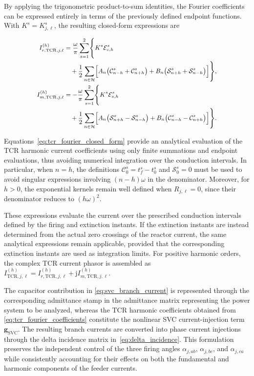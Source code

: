 \documentclass[journal]{IEEEtran}
\begin{document}
By applying the trigonometric product-to-sum identities, the Fourier
coefficients can be expressed entirely in terms of the previously
defined endpoint functions. With $K^s=K_{j,\ell}^s$, the resulting
closed-form expressions are

\begin{subequations}\small
\label{eq:tcr_fourier_closed_form}
\begin{align}
    I_{r,\mathrm{TCR},j,\ell}^{(h)}
    &=\frac{\omega}{\pi}\sum_{s=1}^{2}
    \Biggl\{K^s\mathcal E_{c,h}^s\nonumber\\
    &\quad+\frac{1}{2}\sum_{n\in\mathcal H}
    \Bigl[A_n\bigl(\mathcal C_{n-h}^s+\mathcal C_{n+h}^s\bigr)
    +B_n\bigl(\mathcal S_{n+h}^s+\mathcal S_{n-h}^s\bigr)\Bigr]\Biggr\},\\
    I_{m,\mathrm{TCR},j,\ell}^{(h)}
    &=-\frac{\omega}{\pi}\sum_{s=1}^{2}
    \Biggl\{K^s\mathcal E_{s,h}^s\nonumber\\
    &\quad+\frac{1}{2}\sum_{n\in\mathcal H}
    \Bigl[A_n\bigl(\mathcal S_{n+h}^s-\mathcal S_{n-h}^s\bigr)
    +B_n\bigl(\mathcal C_{n-h}^s-\mathcal C_{n+h}^s\bigr)\Bigr]\Biggr\}.
\end{align}
\end{subequations}

Equations~\eqref{eq:tcr_fourier_closed_form} provide an analytical
evaluation of the TCR harmonic current coefficients using only finite
summations and endpoint evaluations, thus avoiding numerical
integration over the conduction intervals. In particular, when
$n=h$, the definitions $\mathcal C_0^s=t_f^s-t_0^s$ and
$\mathcal S_0^s=0$ must be used to avoid singular expressions involving
$(n-h)\omega$ in the denominator. Moreover, for $h>0$, the exponential
kernels remain well defined when $R_{j,\ell}=0$, since their
denominator reduces to $(h\omega)^2$.

These expressions evaluate the current over the prescribed conduction
intervals defined by the firing and extinction instants. If the
extinction instants are instead determined from the actual zero
crossings of the reactor current, the same analytical expressions
remain applicable, provided that the corresponding extinction
instants are used as integration limits. For positive harmonic orders, the complex TCR current phasor is
assembled as $I_{\mathrm{TCR},j,\ell}^{(h)}
    =
    I_{r,\mathrm{TCR},j,\ell}^{(h)}
    +\mathrm{j}I_{m,\mathrm{TCR},j,\ell}^{(h)}.$

 The capacitor contribution in
\eqref{eq:svc_branch_current} is represented through the corresponding
admittance stamp in the admittance matrix representing the power system to be analyzed, whereas the TCR harmonic
coefficients obtained from \eqref{eq:tcr_fourier_coefficients}
constitute the nonlinear SVC current-injection term
$\bm{g}_{\mathrm{SVC}}$. The resulting branch currents are converted
into phase current injections through the delta incidence matrix
in~\eqref{eq:delta_incidence}. This formulation preserves the
independent control of the three firing angles
$\alpha_{j,ab}$, $\alpha_{j,bc}$, and $\alpha_{j,ca}$ while
consistently accounting for their effects on both the fundamental
and harmonic components of the feeder currents.
\end{document}
